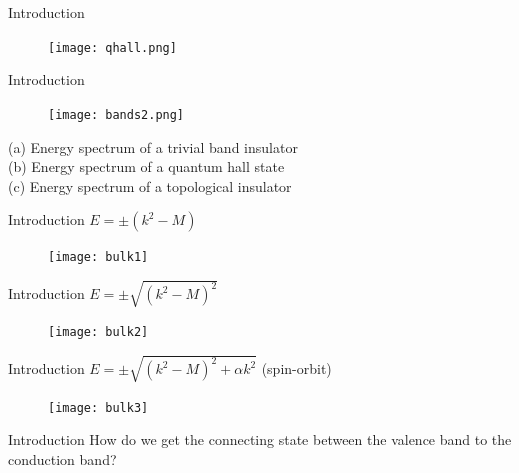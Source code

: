 \documentclass[]{beamer}
\begin{document}
\begin{frame}{Introduction}


\begin{figure}
\center
\texttt{[image: qhall.png]}

\end{figure}

\end{frame}

\begin{frame}{Introduction}
\begin{figure}
\center
\texttt{[image: bands2.png]}

\end{figure}

(a) Energy spectrum of a trivial band insulator \\
(b)  Energy spectrum of a quantum hall state \\
(c)  Energy spectrum of a topological insulator \\

\end{frame}



\begin{frame}{Introduction}
$E = \pm(k^2 - M)$
\begin{figure}
\center
\texttt{[image: bulk1]}

\end{figure}
\end{frame}  


\begin{frame}{Introduction}
$E = \pm\sqrt{(k^2 - M)^2}$
\begin{figure}
\center
\texttt{[image: bulk2]}

\end{figure}
\end{frame}  


\begin{frame}{Introduction}
$E = \pm\sqrt{(k^2 - M)^2 +\alpha k^2}$ (spin-orbit)
\begin{figure}
\center
\texttt{[image: bulk3]}

\end{figure}
\end{frame}  

\begin{frame}{Introduction}
\center
How do we get the connecting state between the valence band to the conduction band?\\
\end{frame}  
\end{document}
